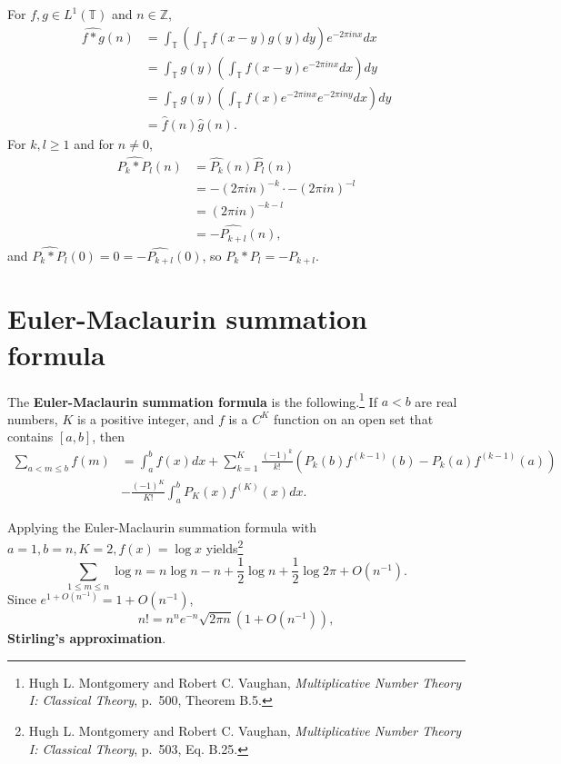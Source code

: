 \documentclass{article}
\theoremstyle{definition}
\theoremstyle{definition}
\begin{document}
For $f,g \in L^1(\mathbb{T})$ and $n \in \mathbb{Z}$,
\begin{align*}
\widehat{f*g}(n)&=\int_{\mathbb{T}} \left( \int_{\mathbb{T}} f(x-y) g(y) dy \right) e^{-2\pi inx} dx\\
&=\int_{\mathbb{T}} g(y) \left( \int_{\mathbb{T}} f(x-y) e^{-2\pi inx} dx \right) dy\\
&=\int_{\mathbb{T}} g(y) \left( \int_{\mathbb{T}} f(x) e^{-2\pi inx} e^{-2\pi iny} dx\right) dy\\
&=\widehat{f}(n) \widehat{g}(n).
\end{align*}
For $k,l \geq 1$ and for $n \neq 0$,
\begin{align*}
\widehat{P_k * P_l}(n)&=\widehat{P_k}(n) \widehat{P_l}(n)\\
&= - (2\pi in)^{-k} \cdot  - (2\pi in)^{-l}\\
&=(2\pi in)^{-k-l}\\
&=-\widehat{P_{k+l}}(n),
\end{align*}
and $\widehat{P_k * P_l}(0) = 0 = -\widehat{P_{k+l}}(0)$, so
$P_k * P_l = - P_{k+l}$. 



\section{Euler-Maclaurin summation formula}
The \textbf{Euler-Maclaurin summation formula} is the following.\footnote{Hugh L. Montgomery and Robert C. Vaughan,
{\em Multiplicative Number Theory I: Classical Theory}, p.~500, Theorem B.5.} If $a<b$ are real numbers,
$K$ is a positive integer, and $f$ is a $C^K$ function on an open set that contains $[a,b]$, then 
\begin{align*}
\sum_{a<m \leq b} f(m)&=\int_a^b f(x) dx + \sum_{k=1}^K \frac{(-1)^k}{k!} (P_k(b) f^{(k-1)}(b)-P_k(a) f^{(k-1)}(a))\\
&-\frac{(-1)^K}{K!} \int_a^b P_K(x)  f^{(K)}(x) dx.
\end{align*}

Applying the Euler-Maclaurin summation formula with $a=1, b=n, K=2, f(x)=\log x$ yields\footnote{Hugh L. Montgomery and Robert C. Vaughan,
{\em Multiplicative Number Theory I: Classical Theory}, p.~503, Eq. B.25.}
\[
\sum_{1 \leq m \leq n} \log n = n \log n - n  + \frac{1}{2} \log n + \frac{1}{2} \log 2\pi + O(n^{-1}).
\]
Since $e^{1+O(n^{-1})} = 1+O(n^{-1})$,
\[
n! = n^n e^{-n} \sqrt{2\pi n} (1+O(n^{-1})),
\]
\textbf{Stirling's approximation}. 
\end{document}
